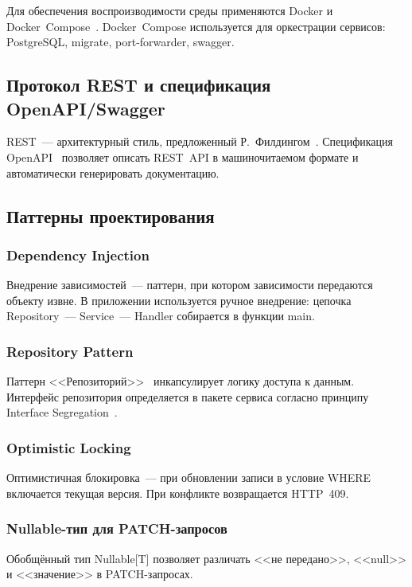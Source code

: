 \documentclass[a4paper,14pt]{extarticle}
\begin{document}
Для обеспечения воспроизводимости среды применяются Docker и Docker~Compose~\cite{docker}. Docker~Compose используется для оркестрации сервисов: PostgreSQL, migrate, port-forwarder, swagger.

\subsection{Протокол REST и спецификация OpenAPI/Swagger}

REST~--- архитектурный стиль, предложенный Р.~Филдингом~\cite{fielding2000}. Спецификация OpenAPI~\cite{openapi} позволяет описать REST~API в машиночитаемом формате и автоматически генерировать документацию.

\subsection{Паттерны проектирования}

\subsubsection{Dependency Injection}

Внедрение зависимостей~--- паттерн, при котором зависимости передаются объекту извне. В приложении используется ручное внедрение: цепочка Repository~--- Service~--- Handler собирается в функции main.

\subsubsection{Repository Pattern}

Паттерн <<Репозиторий>>~\cite{fowler2020} инкапсулирует логику доступа к данным. Интерфейс репозитория определяется в пакете сервиса согласно принципу Interface Segregation~\cite{gamma1994}.

\subsubsection{Optimistic Locking}

Оптимистичная блокировка~--- при обновлении записи в условие WHERE включается текущая версия. При конфликте возвращается HTTP~409.

\subsubsection{Nullable-тип для PATCH-запросов}

Обобщённый тип Nullable[T] позволяет различать <<не передано>>, <<null>> и <<значение>> в PATCH-запросах.
\end{document}
